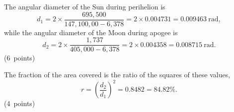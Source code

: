 The angular diameter of the Sun during perihelion is
\[
d_1=2\times\frac{695{,}500}{147{,}100{,}00-6{,}378}
=2\times0.004731=0.009463\ \mathrm{rad},
\]
while the angular diameter of the Moon during apogee is
\[
d_2=2\times\frac{1{,}737}{405{,}000-6{,}378}
=2\times0.004358=0.008715\ \mathrm{rad}.
\]
\hfill\mbox{(6 points)}

The fraction of the area covered is the ratio of the squares of these values,
\[
r=\left(\frac{d_2}{d_1}\right)^2=0.8482=84.82\%.
\]
\hfill\mbox{(4 points)}

